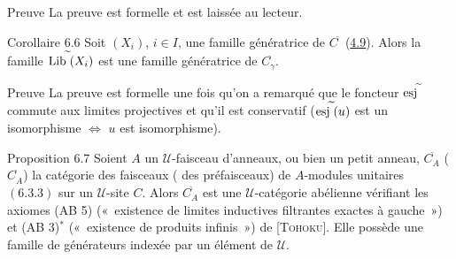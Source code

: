 \documentclass[10pt]{../fichiers-configuration-latex/smfart}
\begin{document}
\begin{enonce*}[remark]{Preuve}
La preuve est formelle et est laissée au lecteur.
\end{enonce*}

\begin{enonce*}{Corollaire 6.6}
Soit $(X_i)$, $i\in I$, une famille génératrice de
$C^{\widetilde{\phantom{,}}}$ (\hyperref[II.subsec4.9]{4.9}). Alors la famille
$\operatorname{Lib}^{\widetilde{\phantom{,}}}(X_i)$ est une famille
génératrice de $C^{\widetilde{\phantom{,}}}_{\gamma}$.
\end{enonce*}

\begin{enonce*}[remark]{Preuve}
La preuve est formelle une fois qu'on a remarqué que le foncteur
$\operatorname{esj}^{\widetilde{\phantom{,}}}$ commute aux limites projectives et
qu'il est conservatif ($\operatorname{esj}^{\widetilde{\phantom{,}}}(u)$ est un
isomorphisme $\Leftrightarrow$ $u$ est isomorphisme).
\end{enonce*}

\begin{enonce*}{Proposition 6.7}
Soient $A$ un $𝒰$-faisceau d'anneaux, ou bien un petit
anneau, $C^{\widetilde{\phantom{,}}}_A$ (\resp
$C^{\widehat{\phantom{,}}}_A$) la catégorie des faisceaux (\resp
des préfaisceaux) de $A$-modules unitaires
$(\hyperref[II.subsubsec6.3.3]{6.3.3})$ sur un $𝒰$-site $C$. Alors
$C^{\widetilde{\phantom{,}}}_A$ est une $𝒰$-catégorie
abélienne vérifiant les axiomes {\rm (AB 5)} (« existence de
limites inductives filtrantes exactes à gauche ») et {\rm (AB
  3)$^{\ast}$} (« existence de produits infinis ») de
{\rm[\textsc{Tohoku}]}. Elle possède une famille de générateurs
indexée par un élément de $𝒰$.
\end{enonce*}
\end{document}
